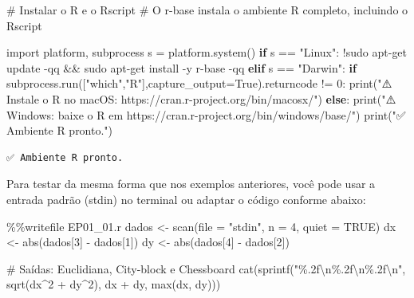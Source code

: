 \documentclass[
  portuguese,
  letterpaper,
  openany,
  oneside,
  12pt,
  a4paper]{book}
\newenvironment{Shaded}{\begin{snugshade}}{\end{snugshade}}
\newcommand{\BuiltInTok}[1]{\textcolor[rgb]{0.00,0.23,0.31}{#1}}
\newcommand{\CharTok}[1]{\textcolor[rgb]{0.13,0.47,0.30}{#1}}
\newcommand{\CommentTok}[1]{\textcolor[rgb]{0.37,0.37,0.37}{#1}}
\newcommand{\ControlFlowTok}[1]{\textcolor[rgb]{0.00,0.23,0.31}{\textbf{#1}}}
\newcommand{\DecValTok}[1]{\textcolor[rgb]{0.68,0.00,0.00}{#1}}
\newcommand{\ImportTok}[1]{\textcolor[rgb]{0.00,0.46,0.62}{#1}}
\newcommand{\NormalTok}[1]{\textcolor[rgb]{0.00,0.23,0.31}{#1}}
\newcommand{\OperatorTok}[1]{\textcolor[rgb]{0.37,0.37,0.37}{#1}}
\newcommand{\SpecialCharTok}[1]{\textcolor[rgb]{0.37,0.37,0.37}{#1}}
\newcommand{\StringTok}[1]{\textcolor[rgb]{0.13,0.47,0.30}{#1}}
\newcommand{\VariableTok}[1]{\textcolor[rgb]{0.07,0.07,0.07}{#1}}
\begin{document}
\begin{Shaded}
\begin{Highlighting}[]
\CommentTok{\# Instalar o R e o Rscript}
\CommentTok{\# O r{-}base instala o ambiente R completo, incluindo o Rscript}

\ImportTok{import}\NormalTok{ platform, subprocess}
\NormalTok{s }\OperatorTok{=}\NormalTok{ platform.system()}
\ControlFlowTok{if}\NormalTok{ s }\OperatorTok{==} \StringTok{"Linux"}\NormalTok{:}
    \OperatorTok{!}\NormalTok{sudo apt}\OperatorTok{{-}}\NormalTok{get update }\OperatorTok{{-}}\NormalTok{qq }\OperatorTok{\&\&}\NormalTok{ sudo apt}\OperatorTok{{-}}\NormalTok{get install }\OperatorTok{{-}}\NormalTok{y r}\OperatorTok{{-}}\NormalTok{base }\OperatorTok{{-}}\NormalTok{qq}
\ControlFlowTok{elif}\NormalTok{ s }\OperatorTok{==} \StringTok{"Darwin"}\NormalTok{:}
    \ControlFlowTok{if}\NormalTok{ subprocess.run([}\StringTok{"which"}\NormalTok{,}\StringTok{"R"}\NormalTok{],capture\_output}\OperatorTok{=}\VariableTok{True}\NormalTok{).returncode }\OperatorTok{!=} \DecValTok{0}\NormalTok{:}
        \BuiltInTok{print}\NormalTok{(}\StringTok{"⚠️ Instale o R no macOS: https://cran.r{-}project.org/bin/macosx/"}\NormalTok{)}
\ControlFlowTok{else}\NormalTok{:}
    \BuiltInTok{print}\NormalTok{(}\StringTok{"⚠️ Windows: baixe o R em https://cran.r{-}project.org/bin/windows/base/"}\NormalTok{)}
\BuiltInTok{print}\NormalTok{(}\StringTok{"✅ Ambiente R pronto."}\NormalTok{)}
\end{Highlighting}
\end{Shaded}

\begin{verbatim}
✅ Ambiente R pronto.
\end{verbatim}

Para testar da mesma forma que nos exemplos anteriores, você pode usar a
entrada padrão (stdin) no terminal ou adaptar o código conforme abaixo:

\begin{Shaded}
\begin{Highlighting}[]
\OperatorTok{\%\%}\NormalTok{writefile EP01\_01.r}
\NormalTok{dados }\OperatorTok{\textless{}{-}}\NormalTok{ scan(}\BuiltInTok{file} \OperatorTok{=} \StringTok{"stdin"}\NormalTok{, n }\OperatorTok{=} \DecValTok{4}\NormalTok{, quiet }\OperatorTok{=}\NormalTok{ TRUE)}
\NormalTok{dx }\OperatorTok{\textless{}{-}} \BuiltInTok{abs}\NormalTok{(dados[}\DecValTok{3}\NormalTok{] }\OperatorTok{{-}}\NormalTok{ dados[}\DecValTok{1}\NormalTok{])}
\NormalTok{dy }\OperatorTok{\textless{}{-}} \BuiltInTok{abs}\NormalTok{(dados[}\DecValTok{4}\NormalTok{] }\OperatorTok{{-}}\NormalTok{ dados[}\DecValTok{2}\NormalTok{])}

\CommentTok{\# Saídas: Euclidiana, City{-}block e Chessboard}
\NormalTok{cat(sprintf(}\StringTok{"}\SpecialCharTok{\%.2f}\CharTok{\textbackslash{}n}\SpecialCharTok{\%.2f}\CharTok{\textbackslash{}n}\SpecialCharTok{\%.2f}\CharTok{\textbackslash{}n}\StringTok{"}\NormalTok{, }
\NormalTok{    sqrt(dx}\OperatorTok{\^{}}\DecValTok{2} \OperatorTok{+}\NormalTok{ dy}\OperatorTok{\^{}}\DecValTok{2}\NormalTok{), }
\NormalTok{    dx }\OperatorTok{+}\NormalTok{ dy, }
    \BuiltInTok{max}\NormalTok{(dx, dy)))}
\end{Highlighting}
\end{Shaded}
\end{document}
